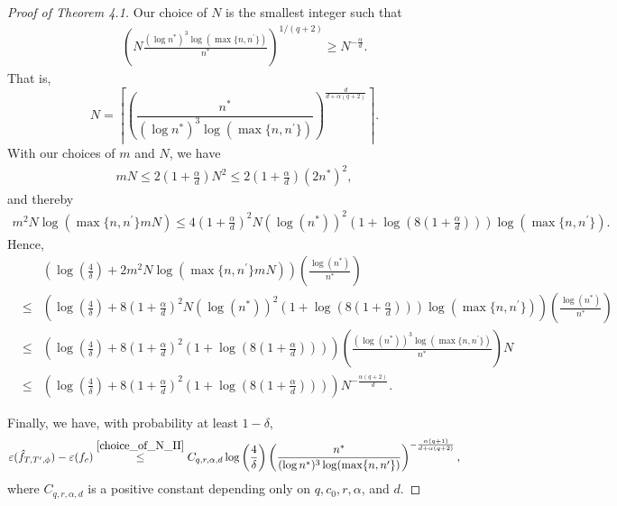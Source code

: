 \documentclass{article}
\begin{document}
\begin{proof}[Proof of Theorem 4.1]
  
  Our choice of $N$ is the smallest integer such that 
  \begin{eqnarray}\label{choice_of_N_II}
   && \left(N\frac{(\log n^*)^3 \log(\max\{n, n^\prime\})}{n^*}\right)^{1/(q+2)} \geq N^{-\frac{\alpha}{d}}.  
  \end{eqnarray}
  That is, $$N =\left\lceil\left(\frac{n^*}{(\log n^*)^3\log (\max\{n,n^\prime\}) }\right)^{\frac{d}{d+ \alpha (q+2)}}\right\rceil.$$
  With our choices of $m$ and $N$, we have 
  \begin{eqnarray*}
      mN \leq 2\left(1+ \frac{\alpha}{d}\right)N^2 \leq 2\left(1+ \frac{\alpha}{d}\right) (2n^*)^2,
  \end{eqnarray*}
  and thereby
  \begin{eqnarray*}
      m^2 N \log(\max\{n, n^\prime\}mN)\leq 4\left(1+ \frac{\alpha}{d}\right)^2 N (\log(n^*))^2 \left(1+\log\left(8\left(1+ \frac{\alpha}{d}\right)\right)\right)\log(\max\{n, n^\prime\}).
  \end{eqnarray*}
  Hence, 
  \begin{eqnarray*}
     && \left(\log \left(\frac{4}{\delta}\right) + 2m^2 N \log(\max\{n, n^\prime\}mN)\right) \left(\frac{\log(n^*)}{n^*}\right)\\
     &\leq& \left(\log \left(\frac{4}{\delta}\right) + 8\left(1+ \frac{\alpha}{d}\right)^2 N (\log(n^*))^2 \left(1+\log\left(8\left(1+ \frac{\alpha}{d}\right)\right)\right)\log(\max\{n, n^\prime\})\right) \left(\frac{\log(n^*)}{n^*}\right)\\
     &\leq&  \left(\log \left(\frac{4}{\delta}\right) + 8\left(1+ \frac{\alpha}{d}\right)^2  \left(1+\log\left(8\left(1+ \frac{\alpha}{d}\right)\right)\right)\right) \left(\frac{(\log(n^*))^3\log(\max\{n, n^\prime\}) }{n^*}\right)N\\
     &\leq&  \left(\log \left(\frac{4}{\delta}\right) + 8\left(1+ \frac{\alpha}{d}\right)^2  \left(1+\log\left(8\left(1+ \frac{\alpha}{d}\right)\right)\right)\right) N^{-\frac{\alpha(q+2)}{d}}.
  \end{eqnarray*}

  
  Finally, we have, with probability at least $1-\delta$,
  \begin{eqnarray*}
       \varepsilon(\Hat{f}_{T, T^\prime,\phi}) - \varepsilon(f_c) \stackrel{\eqref{choice_of_N_II}}{\leq}
      C_{q, r,\alpha,d}\log \left(\frac{4}{\delta}\right) \left(\frac{n^*}{(\log n^*)^3 \log(\max\{n, n^\prime\})}\right)^{-\frac{\alpha (q+1)}{d+ \alpha (q+2)}},
  \end{eqnarray*}
  where $C_{q, r,\alpha,d}$ is a positive constant depending only on $q,c_0, r,\alpha$, and $d$. 
  

\end{proof}
\end{document}
